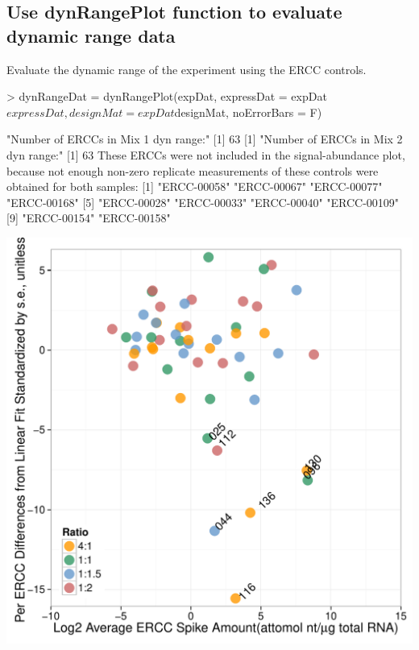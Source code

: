 \documentclass{article}
\begin{document}
\subsection{Use dynRangePlot function to evaluate dynamic range data}
Evaluate the dynamic range of the experiment using the ERCC controls.
\begin{center}
\begin{Schunk}
\begin{Sinput}
> dynRangeDat = dynRangePlot(expDat, expressDat = expDat$expressDat,
                             designMat = expDat$designMat, noErrorBars = F)
\end{Sinput}
\begin{Soutput}
[1] "Number of ERCCs in Mix 1 dyn range:"
[1] 63
[1] "Number of ERCCs in Mix 2 dyn range:"
[1] 63
These ERCCs were not included in the signal-abundance plot,
because not enough non-zero replicate measurements of these 
controls were obtained for both samples:
 [1] "ERCC-00058" "ERCC-00067" "ERCC-00077" "ERCC-00168"
 [5] "ERCC-00028" "ERCC-00033" "ERCC-00040" "ERCC-00109"
 [9] "ERCC-00154" "ERCC-00158"
\end{Soutput}
\end{Schunk}
\includegraphics{erccdashboardVignette-dynRangeDat}
\end{center}
\end{document}
